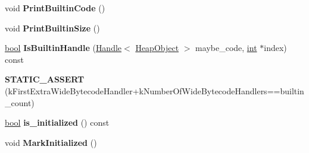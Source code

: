 \begin{DoxyCompactItemize}
\item 
\mbox{\label{classv8_1_1internal_1_1Builtins_af98a2dd00732e7544b91c87d352ff6ae}} 
void {\bfseries Print\+Builtin\+Code} ()
\item 
\mbox{\label{classv8_1_1internal_1_1Builtins_a6903398dedd6742ed58962f1dc507983}} 
void {\bfseries Print\+Builtin\+Size} ()
\item 
\mbox{\label{classv8_1_1internal_1_1Builtins_a0ae268f426bf8781f413c38c6c0a30d2}} 
\mbox{\hyperlink{classbool}{bool}} {\bfseries Is\+Builtin\+Handle} (\mbox{\hyperlink{classv8_1_1internal_1_1Handle}{Handle}}$<$ \mbox{\hyperlink{classv8_1_1internal_1_1HeapObject}{Heap\+Object}} $>$ maybe\+\_\+code, \mbox{\hyperlink{classint}{int}} $\ast$index) const
\item 
\mbox{\label{classv8_1_1internal_1_1Builtins_ab03b173460284dc5552ce776ab906019}} 
{\bfseries S\+T\+A\+T\+I\+C\+\_\+\+A\+S\+S\+E\+RT} (k\+First\+Extra\+Wide\+Bytecode\+Handler+k\+Number\+Of\+Wide\+Bytecode\+Handlers==builtin\+\_\+count)
\item 
\mbox{\label{classv8_1_1internal_1_1Builtins_a24daef3bee850abdeeda159a11ecd117}} 
\mbox{\hyperlink{classbool}{bool}} {\bfseries is\+\_\+initialized} () const
\item 
\mbox{\label{classv8_1_1internal_1_1Builtins_a340b94e18b501a58536cf22aa7ca8f6e}} 
void {\bfseries Mark\+Initialized} ()
\end{DoxyCompactItemize}
